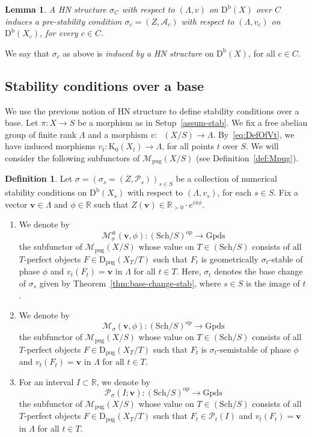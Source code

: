 \documentclass[11pt, reqno]{amsart}
\numberwithin{equation}{section}
\theoremstyle{plain}
\newtheorem{lemma}[theorem]{Lemma}
\theoremstyle{remark}
\theoremstyle{definition}
\newtheorem{definition}[theorem]{Definition}
\theoremstyle{italicsname}
\newcommand{\bv}{\mathbf{v}}
\newcommand{\Db}{\mathrm{D^b}}
\newcommand{\Dpug}{\mathrm{D_{pug}}}
\newcommand{\num}{\mathrm{num}}
\DeclareMathOperator{\Knum}{\rK_{\num}}
\newcommand{\cM}{\mathcal{M}}
\newcommand{\cA}{\mathscr{A}}
\newcommand{\cP}{\mathscr{P}}
\newcommand{\rK}{\mathrm{K}}
\def\RR{\ensuremath{\mathbb{R}}}
\begin{document}
\begin{lemma}\label{lem-HN-induce}
A HN structure $\sigma_C$ with respect to $(\Lambda,v)$ on $\Db(X)$ over $C$ induces a pre-stability condition $\sigma_c=(Z,\cA_c)$ with respect to $(\Lambda,v_c)$ on $\Db(X_c)$, for every $c\in C$.
\end{lemma}

We say that $\sigma_c$ as above is \emph{induced by a HN structure} on $\Db(X)$, for all $c\in C$.

\subsection{Stability conditions over a base}\label{subsec:StabilityBase}

We use the previous notion of HN structure to define stability conditions over a base.
Let $\pi \colon X\to S$ be a morphism as in Setup~\ref{assum-stab}.
We fix a free abelian group of finite rank $\Lambda$ and a morphism $v\colon\Knum(X/S)\to\Lambda$.
By~\eqref{eq:DefOfVt}, we have induced morphisms $v_t\colon\rK_0(X_t)\to\Lambda$, for all points $t$ over $S$.
We will consider the following subfunctors of $\cM_{\mathrm{pug}}(X/S)$ (see Definition~\ref{def:Mpug}).

\begin{definition}
Let ${\sigma}=(\sigma_s=(Z,\cP_s))_{s\in S}$ be a collection of numerical stability conditions on $\Db(X_s)$ with respect to $(\Lambda,v_s)$, for each $s\in S$. 
Fix a vector $\bv\in\Lambda$ and $\phi\in\RR$ such that $Z(\bv)\in\RR_{>0}\cdot e^{i\pi\phi}$. 
\begin{enumerate}[{\rm(1)}]
\item We denote by
\[
\cM^{\mathrm{st}}_{{\sigma}}(\bv,\phi)\colon (\mathrm{Sch}/S)^{\mathrm{op}}\longrightarrow \mathrm{Gpds}
\]
the subfunctor of $\cM_{\mathrm{pug}}(X/S)$ whose value on $T\in (\mathrm{Sch}/S)$ consists of all $T$-perfect objects $F\in \Dpug(X_T/T)$ such that $F_t$ is geometrically $\sigma_t$-stable of phase $\phi$ and $v_t(F_t)=\bv$ in $\Lambda$ for all $t\in T$. 
Here, $\sigma_t$ denotes the base change of $\sigma_s$ given by Theorem~\ref{thm:base-change-stab}, where $s \in S$ is the image of $t$.
\item We denote by
\[
\cM_{{\sigma}}(\bv,\phi)\colon(\mathrm{Sch}/S)^{\mathrm{op}}\longrightarrow \mathrm{Gpds}
\]
the subfunctor of $\cM_{\mathrm{pug}}(X/S)$ whose value on $T\in (\mathrm{Sch}/S)$ consists of all $T$-perfect objects $F\in \Dpug(X_T/T)$ such that $F_t$ is $\sigma_t$-semistable of phase $\phi$ and $v_t(F_t)=\bv$ in $\Lambda$ for all $t\in T$.
\item  For an interval $I\subset\RR$, we denote by
\[
\cP_{{\sigma}}(I;\bv)\colon(\mathrm{Sch}/S)^{\mathrm{op}}\longrightarrow \mathrm{Gpds}
\]
the subfunctor of $\cM_{\mathrm{pug}}(X/S)$ whose value on $T\in(\mathrm{Sch}/S)$ consists of all $T$-perfect objects $F\in \Dpug(X_T/T)$ such that $F_t\in \cP_t(I)$ and $v_t(F_t)=\bv$ in $\Lambda$ for all $t\in T$.
\end{enumerate}
\end{definition}
\end{document}

